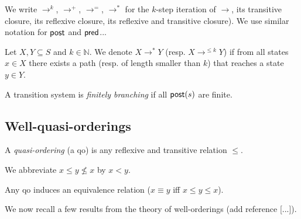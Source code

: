 
We write $\rightarrow^{k}$, $\rightarrow^{+}$, $\rightarrow^{=}$, $\rightarrow^{*}$
for the $k$-step iteration of $\rightarrow$, its transitive closure, its reflexive closure, its reflexive and transitive closure). We use similar notation for $\textsf{post}$ and $\textsf{pred}$...

Let $X,Y \subseteq S$ and $k \in \mathbb{N}$. We denote $X \longrightarrow^{*} Y$ (resp. $X \longrightarrow^{\leq k} Y$) if from all states $x \in X$ there exists a path (resp. of length smaller than $k$) that reaches a state $y \in Y$.


A transition system is {\em finitely branching} if all $\textsf{post}(s)$ are finite. 



\subsection{Well-quasi-orderings}

A {\em quasi-ordering} (a qo) is any reflexive and transitive relation $\leq$.

We abbreviate $x \leq y \not\leq x$ by $x < y$.


Any qo induces an equivalence relation ($x \equiv y$ iff $x \leq y \leq x$).

We now recall a few results from the theory of well-orderings (add reference [...]).


